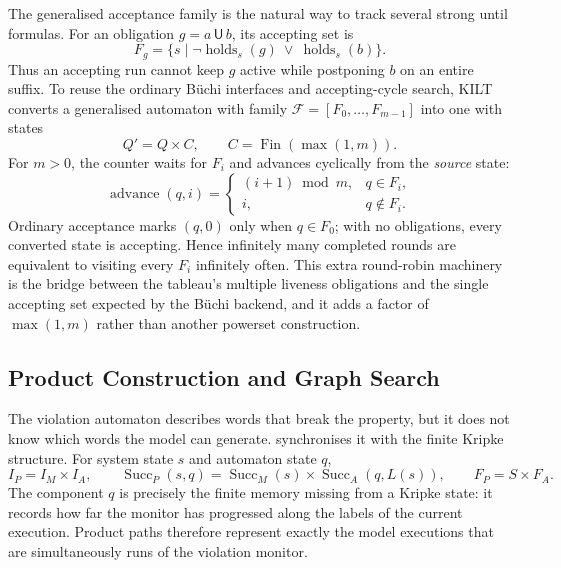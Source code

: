 The generalised acceptance family is the natural way to track several strong
until formulas.  For an obligation $g=a\,\mathsf{U}\,b$, its accepting set is
\[
 F_g=\{s\mid \neg\operatorname{holds}_s(g)\ \lor\
                    \operatorname{holds}_s(b)\}.
\]
Thus an accepting run cannot keep $g$ active while postponing $b$ on an entire suffix. To
reuse the ordinary B\"uchi interfaces and accepting-cycle search, KILT converts
a generalised automaton with family $\mathcal F=[F_0,\ldots,F_{m-1}]$ into one
with states
\[
 Q'=Q\times C,\qquad C=\operatorname{Fin}(\max(1,m)).
\]
For $m>0$, the counter waits for $F_i$ and advances cyclically from the
\emph{source} state:
\[
 \operatorname{advance}(q,i)=
 \begin{cases}
   (i+1)\bmod m,&q\in F_i,\\
   i,&q\notin F_i.
 \end{cases}
\]
Ordinary acceptance marks $(q,0)$ only when $q\in F_0$; with no obligations,
every converted state is accepting.  Hence infinitely many completed rounds
are equivalent to visiting every $F_i$ infinitely often.  This extra
round-robin machinery is the bridge between the tableau's multiple liveness
obligations and the single accepting set expected by the B\"uchi backend, and
it adds a factor of $\max(1,m)$ rather than another powerset construction.

\subsection{Product Construction and Graph Search}\label{sec:indexed-search}

The violation automaton describes words that break the property, but it does
not know which words the model can generate.  \sourcefile{Product.lean}
synchronises it with the finite Kripke structure.  For system state $s$ and
automaton state $q$,
\[
 I_P=I_M\times I_A,\qquad
 \operatorname{Succ}_P(s,q)=
 \operatorname{Succ}_M(s)\times
 \operatorname{Succ}_A(q,L(s)),\qquad
 F_P=S\times F_A.
\]
The component $q$ is precisely the finite memory missing from a Kripke state:
it records how far the monitor has progressed along the labels of the current
execution.  Product paths therefore represent exactly the model executions
that are simultaneously runs of the violation monitor.

